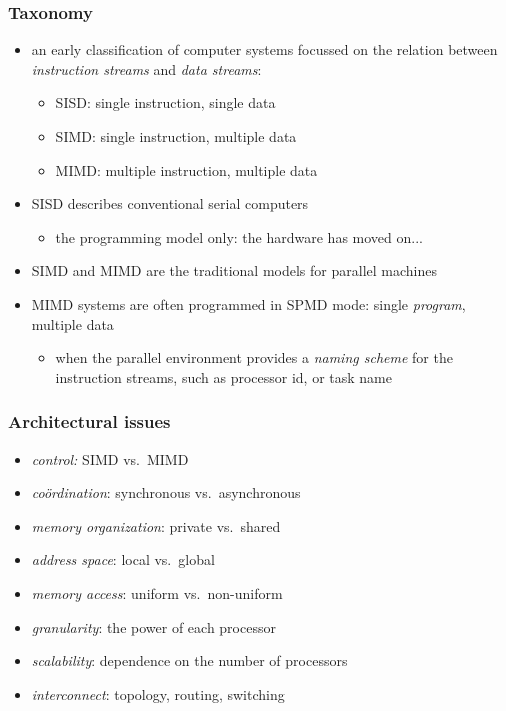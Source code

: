 \begin{frame}[fragile]
%
  \frametitle{Taxonomy}
%
  \begin{itemize}
%
  \item an early classification of computer systems focussed on the relation between {\em
    instruction streams} and {\em data streams}:
    \begin{itemize}
      \item SISD: single instruction, single data
      \item SIMD: single instruction, multiple data
      \item MIMD: multiple instruction, multiple data
    \end{itemize}
%
    \item SISD describes conventional serial computers
    \begin{itemize}
      \item the programming model only: the hardware has moved on...
    \end{itemize}
%
    \item SIMD and MIMD are the traditional models for parallel machines
%
    \item MIMD systems are often programmed in SPMD mode: single {\em program}, multiple data
      \begin{itemize}
      \item when the parallel environment provides a {\em naming scheme} for the instruction
        streams, such as processor id, or task name
      \end{itemize}
  \end{itemize}
%
\end{frame}

\begin{frame}[fragile]
%
  \frametitle{Architectural issues}
%
  \begin{itemize}
%
  \item {\em control:} SIMD vs.~MIMD
  \item {\em co\"ordination}: synchronous vs.~asynchronous
  \item {\em memory organization}: private vs.~shared
  \item {\em address space}: local vs.~global
  \item {\em memory access}: uniform vs.~non-uniform
  \item {\em granularity}: the power of each processor
  \item {\em scalability}: dependence on the number of processors
  \item {\em interconnect}: topology, routing, switching
%
  \end{itemize}
%
\end{frame}

